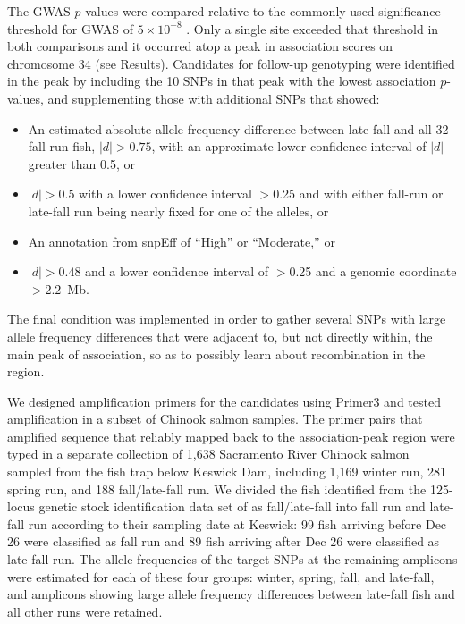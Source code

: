The GWAS $p$-values were compared relative to the commonly used significance threshold for
GWAS of $5\times 10^{-8}$ \citep{chen2021revisiting}.  Only a single site exceeded that threshold in both comparisons and it occurred
atop a peak in association scores on chromosome 34 (see
Results). Candidates for follow-up genotyping were identified in the peak by including the 10
SNPs in that peak with the lowest association $p$-values, and supplementing those with additional SNPs that
showed:
\begin{itemize}
\item An estimated absolute allele frequency difference between late-fall and all 32 fall-run fish, $|d| >0.75$,  with an approximate lower confidence interval of $|d|$ greater than 0.5,  or
\item $|d| >0.5$ with a lower confidence interval $>$0.25 and
with either fall-run or late-fall run being nearly fixed for one of the alleles, or
\item An annotation from snpEff \citep{cingolani2012program} of ``High'' or ``Moderate,'' or
\item $|d|>0.48$ and a lower confidence interval of $>$0.25 and a
genomic  coordinate $> 2.2$~Mb.
\end{itemize}
The final condition was implemented in order to gather several SNPs with large allele frequency differences
that were adjacent to, but not directly within, the main peak of association, so as to possibly learn about
recombination in the region.  

We designed amplification primers for the candidates using
Primer3 \citep{koressaar2007enhancements,untergasser2012primer3} and tested amplification in a
subset of Chinook salmon
samples. The primer pairs that amplified sequence that reliably mapped back to the association-peak region were typed
in a separate collection of 1,638 Sacramento River Chinook salmon sampled from the fish trap below Keswick Dam, including 1,169 winter run, 281 spring
run, and 188 fall/late-fall run. We divided the fish identified
from the 125-locus genetic
stock identification data set of \citet{thompson2020complex}  as fall/late-fall into fall run and late-fall run according
to their sampling date at Keswick:  99 fish arriving before Dec 26 were classified as fall run and 89 fish arriving after Dec 26 were
classified as late-fall run.   The allele frequencies of the target SNPs at the remaining amplicons
were
estimated for each of these four groups: winter, spring, fall, and late-fall, and
amplicons showing large allele frequency differences between late-fall fish and all other runs were retained.


